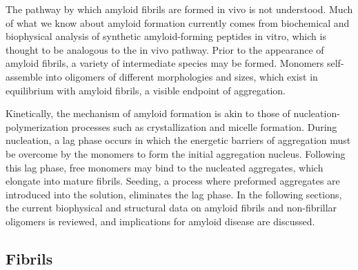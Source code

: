 
The pathway by which amyloid fibrils are formed in vivo is not understood. Much of what we know about amyloid formation currently comes from biochemical and biophysical analysis of synthetic amyloid-forming peptides in vitro, which is thought to be analogous to the in vivo pathway. Prior to the appearance of amyloid fibrils, a variety of intermediate species may be formed.\cite{Chiti:2006fz}  Monomers self-assemble into oligomers of different morphologies and sizes, which exist in equilibrium with amyloid fibrils, a visible endpoint of aggregation.\cite{Chiti:2006fz}

Kinetically, the mechanism of amyloid formation is akin to those of nucleation-polymerization processes such as crystallization and micelle formation.\cite{Murphy:2002fe}
During nucleation, a lag phase occurs in which the energetic barriers of aggregation must be overcome by the monomers to form the initial aggregation nucleus.\cite{Murphy:2002fe} Following this lag phase, free monomers may bind to the nucleated aggregates, which elongate into mature fibrils.\cite{Murphy:2002fe} Seeding, a process where preformed aggregates are introduced into the solution, eliminates the lag phase.\cite{Harper:1997ix,Jarrett:1993vm} In the following sections, the current biophysical and structural data on amyloid fibrils and non-fibrillar oligomers is reviewed, and implications for amyloid disease are discussed.


\subsection{Fibrils}

